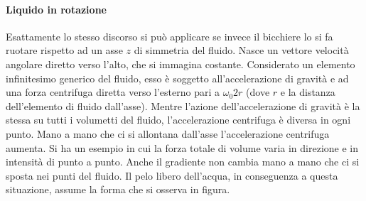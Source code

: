 \documentclass[10pt,a4paper]{book}
\begin{document}
\paragraph{Liquido in rotazione} Esattamente lo stesso discorso si può applicare se invece il bicchiere lo si fa ruotare rispetto ad un asse $z$ di simmetria del fluido. Nasce un vettore velocità angolare diretto verso l'alto, che si immagina costante.
Considerato un elemento infinitesimo generico del fluido, esso è soggetto all'accelerazione di gravità e ad una forza centrifuga diretta verso l'esterno pari a $\omega_0 2r$ (dove $r$ e la distanza dell'elemento di fluido dall'asse).
Mentre l'azione dell'accelerazione di gravità è la stessa su tutti i volumetti del fluido, l'accelerazione centrifuga è diversa in ogni punto. Mano a mano che ci si allontana dall'asse l'accelerazione centrifuga aumenta. Si ha un esempio in cui la forza totale di volume varia in direzione e in intensità di punto a punto. Anche il gradiente non cambia mano a mano che ci si sposta nei punti del fluido. Il pelo libero dell'acqua, in conseguenza a questa situazione, assume la forma che si osserva in figura.
\end{document}
